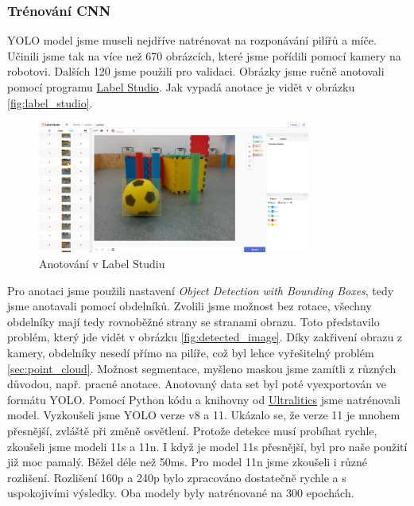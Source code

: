 \documentclass[a4paper,12pt]{article}
\begin{document}
\subsubsection{Trénování CNN}
YOLO model jsme museli nejdříve natrénovat na rozponávání pilířů a míče. Učinili jsme tak na více než 670 obrázcích,
které jsme pořídili pomocí kamery na robotovi. Dalších 120 jsme použili pro validaci. Obrázky jsme ručně anotovali pomocí programu \href{https://labelstud.io/}{Label Studio}. Jak vypadá anotace je vidět v obrázku \eqref{fig:label_studio}.
\begin{figure}[H]
    \centering
    \includegraphics[width=0.8\textwidth]{pictures/label_studio.png}
    \caption{Anotování v Label Studiu}
    \label{fig:label_studio}	
\end{figure}
Pro anotaci jsme použili nastavení \textit{Object Detection with Bounding Boxes}, tedy jsme anotavali pomocí obdelníků. Zvolili jsme možnost bez rotace, všechny obdelníky mají tedy rovnoběžné strany se stranami obrazu. 
Toto představilo problém, který jde vidět v obrázku \eqref{fig:detected_image}. Díky zakřivení obrazu z kamery, obdelníky nesedí přímo na pilíře, což byl lehce vyřešitelný problém \eqref{sec:point_cloud}. Možnost segmentace, myšleno maskou jsme zamítli z různých důvodou, např. pracné anotace. 
Anotovaný data set byl poté vyexportován ve formátu YOLO.
Pomocí Python kódu a knihovny od \href{https://docs.ultralytics.com/}{Ultralitics} jsme natrénovali model. Vyzkoušeli jsme YOLO verze v8 a 11. Ukázalo se, že verze 11 je mnohem přesnější, zvláště při změně osvětlení. 
Protože detekce musí probíhat rychle, zkoušeli jsme modeli 11s a 11n. I když je model 11s přesnější, byl pro naše použití již moc pamalý. 
Běžel déle než 50ms. Pro model 11n jsme zkoušeli i různé rozlišení. Rozlišení 160p a 240p bylo zpracováno dostatečně rychle a s uspokojivími výsledky. Oba modely byly natrénované na 300 epochách.
\end{document}
